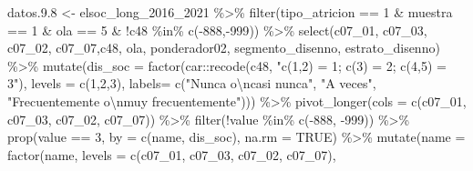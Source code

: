 \documentclass[
  12pt,
]{book}
\newenvironment{Shaded}{\begin{snugshade}}{\end{snugshade}}
\newcommand{\AttributeTok}[1]{\textcolor[rgb]{0.77,0.63,0.00}{#1}}
\newcommand{\ConstantTok}[1]{\textcolor[rgb]{0.00,0.00,0.00}{#1}}
\newcommand{\DecValTok}[1]{\textcolor[rgb]{0.00,0.00,0.81}{#1}}
\newcommand{\FloatTok}[1]{\textcolor[rgb]{0.00,0.00,0.81}{#1}}
\newcommand{\FunctionTok}[1]{\textcolor[rgb]{0.00,0.00,0.00}{#1}}
\newcommand{\NormalTok}[1]{#1}
\newcommand{\OtherTok}[1]{\textcolor[rgb]{0.56,0.35,0.01}{#1}}
\newcommand{\SpecialCharTok}[1]{\textcolor[rgb]{0.00,0.00,0.00}{#1}}
\newcommand{\StringTok}[1]{\textcolor[rgb]{0.31,0.60,0.02}{#1}}
\begin{document}
\begin{Shaded}
\begin{Highlighting}[]
\NormalTok{datos.}\FloatTok{9.8} \OtherTok{\textless{}{-}}\NormalTok{ elsoc\_long\_2016\_2021 }\SpecialCharTok{\%\textgreater{}\%} 
  \FunctionTok{filter}\NormalTok{(tipo\_atricion }\SpecialCharTok{==} \DecValTok{1} \SpecialCharTok{\&}\NormalTok{ muestra }\SpecialCharTok{==} \DecValTok{1} \SpecialCharTok{\&}\NormalTok{ ola }\SpecialCharTok{==} \DecValTok{5} \SpecialCharTok{\&} \SpecialCharTok{!}\NormalTok{c48 }\SpecialCharTok{\%in\%} \FunctionTok{c}\NormalTok{(}\SpecialCharTok{{-}}\DecValTok{888}\NormalTok{,}\SpecialCharTok{{-}}\DecValTok{999}\NormalTok{)) }\SpecialCharTok{\%\textgreater{}\%}  
  \FunctionTok{select}\NormalTok{(c07\_01, c07\_03, c07\_02, c07\_07,c48, ola, ponderador02, segmento\_disenno, estrato\_disenno) }\SpecialCharTok{\%\textgreater{}\%} 
  \FunctionTok{mutate}\NormalTok{(}\AttributeTok{dis\_soc =} \FunctionTok{factor}\NormalTok{(car}\SpecialCharTok{::}\FunctionTok{recode}\NormalTok{(c48, }\StringTok{"c(1,2) = 1; c(3) = 2; c(4,5) = 3"}\NormalTok{),}
                               \AttributeTok{levels =} \FunctionTok{c}\NormalTok{(}\DecValTok{1}\NormalTok{,}\DecValTok{2}\NormalTok{,}\DecValTok{3}\NormalTok{), }\AttributeTok{labels=} \FunctionTok{c}\NormalTok{(}\StringTok{"Nunca o}\SpecialCharTok{\textbackslash{}n}\StringTok{casi nunca"}\NormalTok{, }\StringTok{"A veces"}\NormalTok{,}
                                         \StringTok{"Frecuentemente o}\SpecialCharTok{\textbackslash{}n}\StringTok{muy frecuentemente"}\NormalTok{))) }\SpecialCharTok{\%\textgreater{}\%}
  \FunctionTok{pivot\_longer}\NormalTok{(}\AttributeTok{cols =} \FunctionTok{c}\NormalTok{(c07\_01, c07\_03, c07\_02, c07\_07)) }\SpecialCharTok{\%\textgreater{}\%} 
  \FunctionTok{filter}\NormalTok{(}\SpecialCharTok{!}\NormalTok{value }\SpecialCharTok{\%in\%} \FunctionTok{c}\NormalTok{(}\SpecialCharTok{{-}}\DecValTok{888}\NormalTok{, }\SpecialCharTok{{-}}\DecValTok{999}\NormalTok{)) }\SpecialCharTok{\%\textgreater{}\%} 
  \FunctionTok{prop}\NormalTok{(value }\SpecialCharTok{==} \DecValTok{3}\NormalTok{, }\AttributeTok{by =} \FunctionTok{c}\NormalTok{(name, dis\_soc), }\AttributeTok{na.rm =} \ConstantTok{TRUE}\NormalTok{) }\SpecialCharTok{\%\textgreater{}\%} 
  \FunctionTok{mutate}\NormalTok{(}\AttributeTok{name =} \FunctionTok{factor}\NormalTok{(name,}
                       \AttributeTok{levels =} \FunctionTok{c}\NormalTok{(}\StringTok{\textquotesingle{}c07\_01\textquotesingle{}}\NormalTok{, }\StringTok{\textquotesingle{}c07\_03\textquotesingle{}}\NormalTok{, }\StringTok{\textquotesingle{}c07\_02\textquotesingle{}}\NormalTok{, }\StringTok{\textquotesingle{}c07\_07\textquotesingle{}}\NormalTok{),}

\end{Highlighting}
\end{Shaded}
\end{document}
